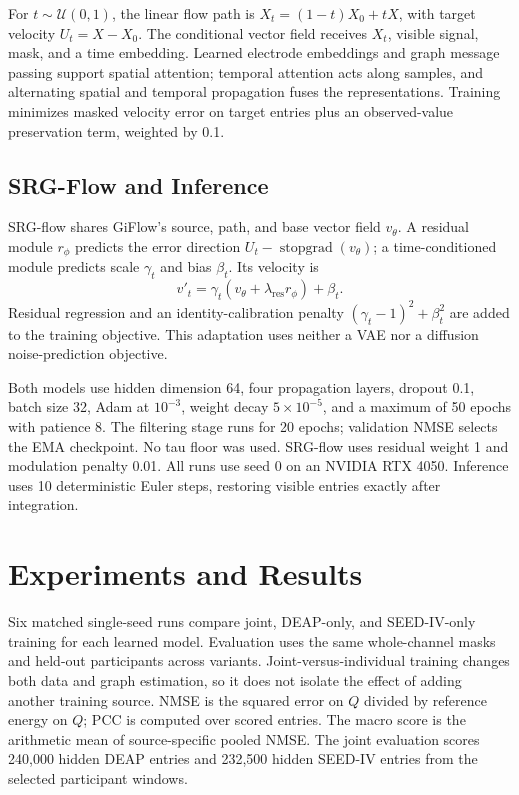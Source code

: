 \documentclass{article}
\begin{document}
For $t\sim\mathcal{U}(0,1)$, the linear flow path is
$X_t=(1-t)X_0+tX$, with target velocity $U_t=X-X_0$. The conditional
vector field receives $X_t$, visible signal, mask, and a time embedding.
Learned electrode embeddings and graph message passing support spatial
attention; temporal attention acts along samples, and alternating spatial
and temporal propagation fuses the representations. Training minimizes
masked velocity error on target entries plus an observed-value preservation
term, weighted by 0.1.

\subsection{SRG-Flow and Inference}

SRG-flow shares GiFlow's source, path, and base vector field $v_\theta$.
A residual module $r_\phi$ predicts the error direction
$U_t-\operatorname{stopgrad}(v_\theta)$; a time-conditioned module predicts
scale $\gamma_t$ and bias $\beta_t$. Its velocity is
\begin{equation}
v'_t=\gamma_t(v_\theta+\lambda_{\mathrm{res}}r_\phi)+\beta_t.
\end{equation}
Residual regression and an identity-calibration penalty
$(\gamma_t-1)^2+\beta_t^2$ are added to the training objective. This
adaptation uses neither a VAE nor a diffusion noise-prediction objective.

Both models use hidden dimension 64, four propagation layers, dropout 0.1,
batch size 32, Adam at $10^{-3}$, weight decay $5\times10^{-5}$, and a
maximum of 50 epochs with patience 8. The filtering stage runs for 20
epochs; validation NMSE selects the EMA checkpoint. No tau floor was used.
SRG-flow uses residual weight 1 and modulation penalty 0.01. All runs use
seed 0 on an NVIDIA RTX 4050. Inference uses 10 deterministic Euler steps,
restoring visible entries exactly after integration.

\section{Experiments and Results}

Six matched single-seed runs compare joint, DEAP-only, and SEED-IV-only
training for each learned model. Evaluation uses the same whole-channel
masks and held-out participants across variants. Joint-versus-individual
training changes both data and graph estimation, so it does not isolate
the effect of adding another training source. NMSE is the squared error on
$Q$ divided by reference energy on $Q$; PCC is computed over scored entries.
The macro score is the arithmetic mean of source-specific pooled NMSE.
The joint evaluation scores 240,000 hidden DEAP entries and 232,500 hidden
SEED-IV entries from the selected participant windows.
\end{document}
